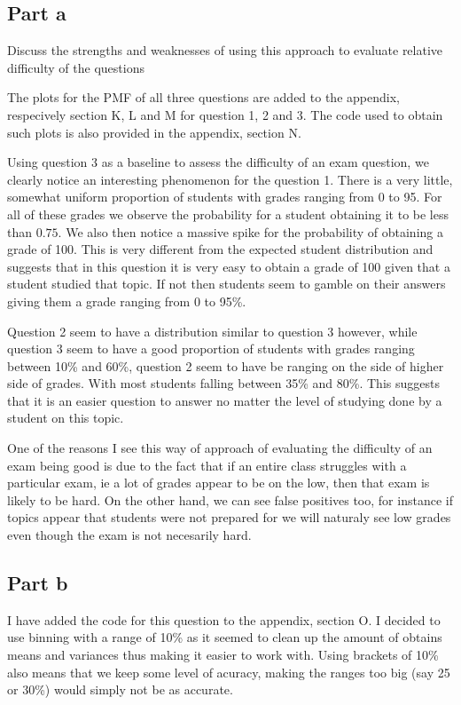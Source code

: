 \documentclass{article}
\begin{document}
\subsection*{Part a}

Discuss the 
strengths and weaknesses of using this approach to evaluate relative difficulty of the
questions

The plots for the PMF of all three questions are added to the appendix, respecively section K, L and M
for question 1, 2 and 3. The code used to obtain such plots is also provided in the appendix, section N.

Using question 3 as a baseline to assess the difficulty of an exam question, we clearly notice an interesting
phenomenon for the question 1. There is a very little, somewhat uniform proportion of students with
grades ranging from 0 to 95. For all of these grades we observe the probability for a student obtaining it 
to be less than $ 0.75 $. We also then notice a massive spike for the probability of obtaining a grade
of 100. This is very different from the expected student distribution and suggests that in this question
it is very easy to obtain a grade of 100 given that a student studied that topic. If not then students seem to 
gamble on their answers giving them a grade ranging from 0 to 95\%.

Question 2 seem to have a distribution similar to question 3 however, while question 3 seem to have a good proportion
of students with grades ranging between 10\% and 60\%, question 2 seem to have be ranging on the side of higher side of grades.
With most students falling between 35\% and 80\%. This suggests that it is an easier question to answer
no matter the level of studying done by a student on this topic.


One of the reasons I see this way of approach of evaluating the difficulty of an exam being good is due to 
the fact that if an entire class struggles with a particular exam, ie a lot of grades appear to be on the low,
then that exam is likely to be hard.
On the other hand, we can see false positives too, for instance if topics appear that students were not prepared for
we will naturaly see low grades even though the exam is not necesarily hard.

\subsection*{Part b}
I have added the code for this question to the appendix, section O. I decided to
use binning with a range of 10\% as it seemed to clean up the amount of obtains means and variances
thus making it easier to work with. Using brackets of 10\% also means that we keep some level of acuracy,
making the ranges too big (say 25 or 30\%) would simply not be as accurate.  
\end{document}
